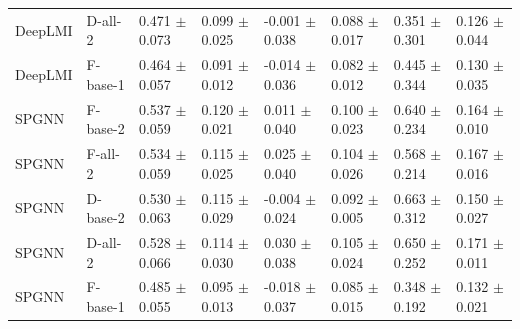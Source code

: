 \begin{landscape}
{\begin{longtable}{llllllll}
DeepLMI & D-all-2 & 0.471 $\pm$ 0.073 & 0.099 $\pm$ 0.025 & -0.001 $\pm$ 0.038 & 0.088 $\pm$ 0.017 & 0.351 $\pm$ 0.301 & 0.126 $\pm$ 0.044 \\
DeepLMI & F-base-1 & 0.464 $\pm$ 0.057 & 0.091 $\pm$ 0.012 & -0.014 $\pm$ 0.036 & 0.082 $\pm$ 0.012 & 0.445 $\pm$ 0.344 & 0.130 $\pm$ 0.035 \\
SPGNN & F-base-2 & 0.537 $\pm$ 0.059 & 0.120 $\pm$ 0.021 & 0.011 $\pm$ 0.040 & 0.100 $\pm$ 0.023 & 0.640 $\pm$ 0.234 & 0.164 $\pm$ 0.010 \\
SPGNN & F-all-2 & 0.534 $\pm$ 0.059 & 0.115 $\pm$ 0.025 & 0.025 $\pm$ 0.040 & 0.104 $\pm$ 0.026 & 0.568 $\pm$ 0.214 & 0.167 $\pm$ 0.016 \\
SPGNN & D-base-2 & 0.530 $\pm$ 0.063 & 0.115 $\pm$ 0.029 & -0.004 $\pm$ 0.024 & 0.092 $\pm$ 0.005 & 0.663 $\pm$ 0.312 & 0.150 $\pm$ 0.027 \\
SPGNN & D-all-2 & 0.528 $\pm$ 0.066 & 0.114 $\pm$ 0.030 & 0.030 $\pm$ 0.038 & 0.105 $\pm$ 0.024 & 0.650 $\pm$ 0.252 & 0.171 $\pm$ 0.011 \\
SPGNN & F-base-1 & 0.485 $\pm$ 0.055 & 0.095 $\pm$ 0.013 & -0.018 $\pm$ 0.037 & 0.085 $\pm$ 0.015 & 0.348 $\pm$ 0.192 & 0.132 $\pm$ 0.021 \\
\end{longtable}
}
\end{landscape}
